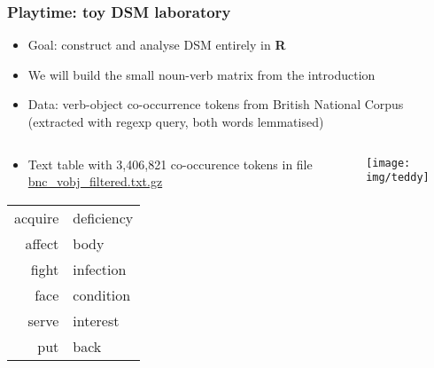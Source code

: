 \begin{frame}
  \frametitle{Playtime: toy DSM laboratory}

  \begin{itemize}
  \item Goal: construct and analyse DSM entirely in \textbf{R}
  \item We will build the small noun-verb matrix from the introduction
  \item Data: verb-object co-occurrence tokens from British National Corpus
    (extracted with regexp query, both words lemmatised)
  \end{itemize}
  \begin{columns}[T]
    \begin{column}{60mm}
      \begin{itemize}
      \item Text table with 3,406,821 co-occurence tokens in file
        {\url{bnc_vobj_filtered.txt.gz}}
      \end{itemize}
      \begin{center}\ungap[.5]
        \begin{tabular}{rl}
          acquire & deficiency \\
          affect & body \\
          fight & infection \\
          face & condition \\
          serve & interest \\
          put & back
        \end{tabular}
      \end{center}
    \end{column}
    \begin{column}{40mm}
      \vspace{12mm}
      \texttt{[image: img/teddy]}
    \end{column}
  \end{columns}
\end{frame}

